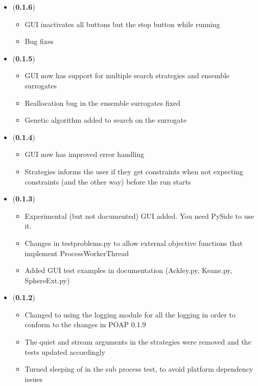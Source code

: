 \documentclass[]{article}
\begin{document}
\begin{itemize}
\item (\textbf{0.1.6}) 
\begin{itemize}
\item GUI inactivates all buttons but the stop button while running
\item Bug fixes
\end{itemize}

\item (\textbf{0.1.5}) 
\begin{itemize}
\item GUI now has support for multiple search strategies and ensemble surrogates
\item Reallocation bug in the ensemble surrogates fixed
\item Genetic algorithm added to search on the surrogate
\end{itemize}

\item (\textbf{0.1.4}) 
\begin{itemize}
\item GUI now has improved error handling 
\item Strategies informs the user if they get constraints when not expecting constraints (and the other way) before the run starts
\end{itemize}

\item (\textbf{0.1.3}) 
\begin{itemize}
\item Experimental (but not documented) GUI added. You need PySide to use it.
\item Changes in testproblems.py to allow external objective functions that implement ProcessWorkerThread
\item Added GUI test examples in documentation (Ackley.py, Keane.py, SphereExt.py)
\end{itemize}

\item (\textbf{0.1.2})
\begin{itemize}
\item 	Changed to using the logging module for all the logging in order to conform to the changes in POAP 0.1.9
\item The quiet and stream arguments in the strategies were removed and the tests updated accordingly
\item Turned sleeping of in the sub process test, to avoid platform dependency issues
\end{itemize}


\end{itemize}
\end{document}
